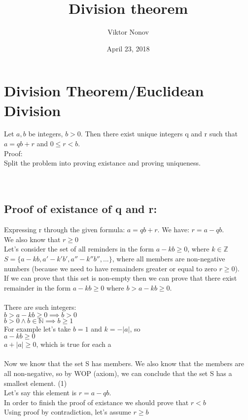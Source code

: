 \documentclass{article}
\title{Division theorem}
\author{Viktor Nonov}
\date{April 23, 2018}
\begin{document}
\section*{Division Theorem/Euclidean Division}
Let $a,b$ be integers, $b > 0$. Then there exist unique integers q and r such that $a = qb + r$ and $0 \leq r < b$.\\

Proof:\\
Split the problem into proving existance and proving uniqueness.\\
\\
\\
\subsection*{Proof of existance of q and r:}
Expressing r through the given formula: $a = qb + r$. We have: $r = a - qb$. \\
We also know that $r \geq 0$\\
Let's consider the set of all reminders in the form $a - kb \geq 0$, where $k \in \mathbb{Z}$\\
$S = \{a - kb, a' - k'b', a'' - k''b'',...\}$, where all members are non-negative numbers (because we need to have remainders greater or equal to zero $r \geq 0$).\\
If we can prove that this set is non-empty then we can prove that there exist remainder in the form $a - kb \geq 0$ where $b > a - kb \geq 0$.\\
\\
There are such integers:\\
$b > a - kb \geq 0 \implies b > 0$\\
$b > 0 \wedge b \in \mathbb{N} \implies b \geq 1$\\
For example let's take $b = 1$ and $k = -|a|$, so\\
$a - kb \geq 0$\\
$a + |a| \geq 0$, which is true for each a\\
\\
Now we know that the set S has members. We also know that the members are all non-negative, so by WOP (axiom), we can conclude that the set S has a smallest element. (1)\\
Let's say this element is $r = a - qb$.\\
In order to finish the proof of existance we should prove that $r < b$\\
Using proof by contradiction, let's assume $r \geq b$\\
\end{document}
